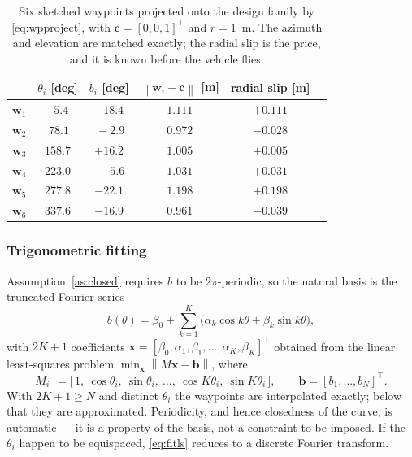 \documentclass[11pt,a4paper]{article}
\newcommand{\cv}{\bm{c}}
\newcommand{\norm}[1]{\left\lVert#1\right\rVert}
\begin{document}
\begin{table}[htbp]
\centering
\caption{Six sketched waypoints projected onto the design family by
\eqref{eq:wpproject}, with $\cv = [0,0,1]^\top$ and $r=1$~m. The azimuth and
elevation are matched exactly; the radial slip is the price, and it is known
before the vehicle flies.}
\label{tab:wp}
\begin{tabular}{lccccc}
\toprule
& $\theta_i$ [deg] & $b_i$ [deg] & $\norm{\bm w_i-\cv}$ [m] & radial slip [m] \\
\midrule
$\bm w_1$ & $\ \ \,5.4$ & $-18.4$ & $1.111$ & $+0.111$ \\
$\bm w_2$ & $\ 78.1$    & $\ -2.9$ & $0.972$ & $-0.028$ \\
$\bm w_3$ & $158.7$     & $+16.2$ & $1.005$ & $+0.005$ \\
$\bm w_4$ & $223.0$     & $\ -5.6$ & $1.031$ & $+0.031$ \\
$\bm w_5$ & $277.8$     & $-22.1$ & $1.198$ & $+0.198$ \\
$\bm w_6$ & $337.6$     & $-16.9$ & $0.961$ & $-0.039$ \\
\bottomrule
\end{tabular}
\end{table}

\subsubsection*{Trigonometric fitting}

Assumption~\ref{as:closed} requires $b$ to be $2\pi$-periodic, so the natural
basis is the truncated Fourier series
\begin{equation}
b(\theta) = \beta_0 + \sum_{k=1}^{K}\big(\alpha_k\cos k\theta + \beta_k\sin k\theta\big),
\label{eq:fourierb}
\end{equation}
with $2K+1$ coefficients $\bm x = [\beta_0,\alpha_1,\beta_1,\dots,\alpha_K,\beta_K]^\top$
obtained from the linear least-squares problem $\min_{\bm x}\norm{M\bm x - \bm b}$,
where
\begin{equation}
M_{i\cdot} = \big[\,1,\ \cos\theta_i,\ \sin\theta_i,\ \dots,\ \cos K\theta_i,\ \sin K\theta_i\,\big],
\qquad
\bm b = [b_1,\dots,b_N]^\top .
\label{eq:fitls}
\end{equation}
With $2K+1 \ge N$ and distinct $\theta_i$ the waypoints are interpolated
exactly; below that they are approximated. Periodicity, and hence closedness of
the curve, is automatic --- it is a property of the basis, not a constraint to
be imposed. If the $\theta_i$ happen to be equispaced, \eqref{eq:fitls} reduces
to a discrete Fourier transform.
\end{document}

